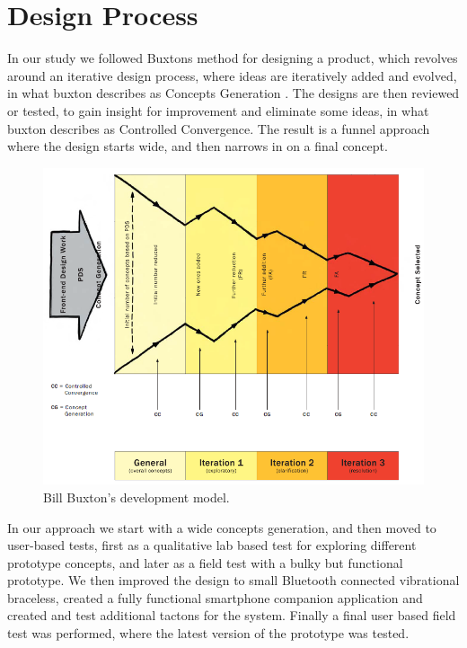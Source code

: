\documentclass{sigchi}
\begin{document}
\section{Design Process}
In our study we followed Buxtons method for designing a product, which revolves around an iterative design process, where ideas are iteratively added and evolved, in what buxton describes as Concepts Generation \cite{buxton07}. The designs are then reviewed or tested, to gain insight for improvement and eliminate some ideas, in what buxton describes as Controlled Convergence. The result is a funnel approach where the design starts wide, and then narrows in on a final concept.
\begin{figure}
\centering
  \includegraphics[width=1.02\columnwidth]{figures/1_development_model.png}
  \caption{Bill Buxton's development model.
}\label{fig:1_development_model}
\end{figure}
In our approach we start with a wide concepts generation, and then moved to user-based tests, first as a qualitative lab based test for exploring different prototype concepts, and later as a field test with a bulky but functional prototype. We then improved the design to small Bluetooth connected vibrational braceless, created a fully functional smartphone companion application and created and test additional tactons for the system. Finally a final user based field test was performed, where the latest version of the prototype was tested. 
\newline
\newline
\end{document}
